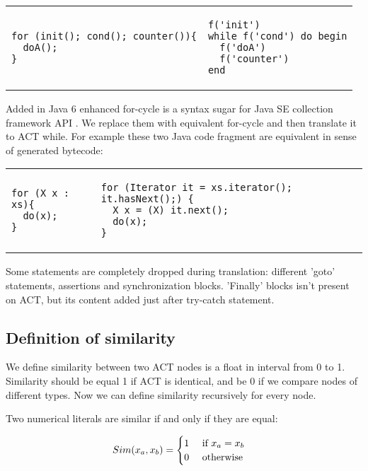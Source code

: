 \begin{tabular}{ p{6cm} p{6cm} }
\begin{verbatim}
for (init(); cond(); counter()){
  doA();
}
\end{verbatim} 
  & 
\begin{verbatim}
f('init')
while f('cond') do begin
  f('doA')
  f('counter')
end
\end{verbatim}
\end{tabular}

Added in Java 6 enhanced for-cycle is a syntax sugar for Java SE collection framework API \cite{gosling05}.
We replace them with equivalent for-cycle and then translate it to ACT while.
For example these two Java code fragment are equivalent in sense of generated bytecode:

\begin{tabular}{ p{6cm} p{6cm} }
\begin{verbatim}
for (X x : xs){
  do(x);
}
\end{verbatim} 
  & 
\begin{verbatim}
for (Iterator it = xs.iterator(); it.hasNext();) {
  X x = (X) it.next();
  do(x);    
}
\end{verbatim}
\end{tabular}

Some statements are completely dropped during translation: different 'goto' statements, assertions and synchronization
blocks. 'Finally' blocks isn't  present on ACT, but its content added just after try-catch statement.

\subsection{Definition of similarity}

We define similarity between two ACT nodes is a float in interval from 0 to 1.
Similarity should be equal 1 if ACT is identical, and be 0 if we compare nodes of different types.
Now we can define similarity recursively for every node.

Two numerical literals are similar if and only if they are equal:

\begin{align*}
Sim(x_a, x_b) &= 
	\begin{cases} 
		\hfill 1    \hfill & \text{ if $x_a = x_b$} \\
		\hfill 0	\hfill & \text{ otherwise} \\
	\end{cases}
\end{align*}

